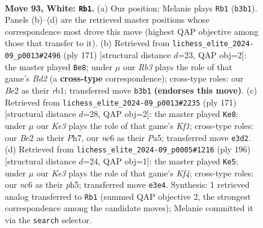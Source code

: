 \documentclass[11pt]{article}
\begin{document}
\clearpage

\begin{figure}[p]\centering
\begin{subfigure}{0.46\textwidth}\centering
\resizebox{\linewidth}{!}{%
\newchessgame
\chessboard[
  setfen={5r2/3k4/P1n5/8/8/1R2K1PP/2P1B3/8 w - - 19 93},
  showmover=false,
  pgfstyle=straightmove, color=movearrow, markmove={b3-b1}
]}
\caption{}
\end{subfigure}\hfill
\begin{subfigure}{0.46\textwidth}\centering
\resizebox{\linewidth}{!}{%
\newchessgame
\chessboard[
  setfen={5r2/3b4/4k3/8/4p2N/4P1K1/8/1R6 b - - 35 86},
  showmover=false,
  pgfstyle=straightmove, color=movearrow, markmove={d7-e8}
]}
\caption{}
\end{subfigure}
\\[4pt]
\begin{subfigure}{0.46\textwidth}\centering
\resizebox{\linewidth}{!}{%
\newchessgame
\chessboard[
  setfen={5k2/7p/8/pp4p1/1b6/8/8/1K6 b - - 35 86},
  showmover=false,
  pgfstyle=straightmove, color=movearrow, markmove={f8-e8}
]}
\caption{}
\end{subfigure}\hfill
\begin{subfigure}{0.46\textwidth}\centering
\resizebox{\linewidth}{!}{%
\newchessgame
\chessboard[
  setfen={2r5/4k3/1R4P1/7p/4BK1P/8/8/8 w - - 1 99},
  showmover=false,
  pgfstyle=straightmove, color=movearrow, markmove={f4-e5}
]}
\caption{}
\end{subfigure}
\caption{\textbf{Move 93, White: \texttt{Rb1}.} (a) Our position; Melanie plays \texttt{Rb1} (\texttt{b3b1}). Panels (b)--(d) are the retrieved master positions whose correspondence most drove this move (highest QAP objective among those that transfer to it). (b) Retrieved from \texttt{lichess\_elite\_2024-09\_p0013\#2496} (ply 171) [structural distance $d$=23, QAP obj=2]: the master played \texttt{Be8}; under $\mu$ our \emph{Rb3} plays the role of that game's \emph{Bd2} (a \textbf{cross-type} correspondence); cross-type roles: our \emph{B}e2 as their \emph{r}b1; transferred move \texttt{b3b1} \textbf{(endorses this move)}. (c) Retrieved from \texttt{lichess\_elite\_2024-09\_p0013\#2235} (ply 171) [structural distance $d$=28, QAP obj=2]: the master played \texttt{Ke8}; under $\mu$ our \emph{Ke3} plays the role of that game's \emph{Kf1}; cross-type roles: our \emph{B}e2 as their \emph{P}h7, our \emph{n}c6 as their \emph{P}a5; transferred move \texttt{e3d2}. (d) Retrieved from \texttt{lichess\_elite\_2024-09\_p0005\#1216} (ply 196) [structural distance $d$=24, QAP obj=1]: the master played \texttt{Ke5}; under $\mu$ our \emph{Ke3} plays the role of that game's \emph{Kf4}; cross-type roles: our \emph{n}c6 as their \emph{p}h5; transferred move \texttt{e3e4}. Synthesis: 1 retrieved analog transferred to \texttt{Rb1} (summed QAP objective 2, the strongest correspondence among the candidate moves); Melanie committed it via the \texttt{search} selector.}
\label{fig:thought-m184}
\end{figure}
\end{document}
